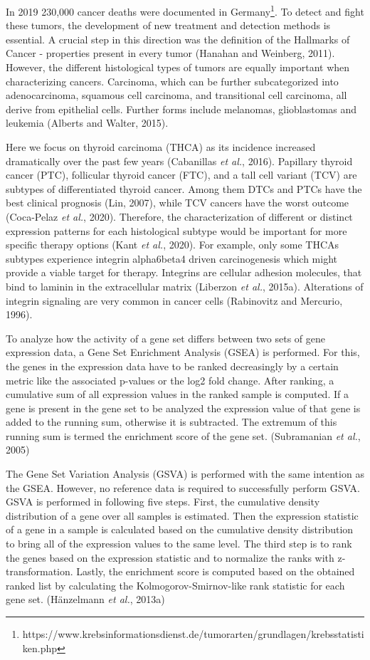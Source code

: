 \documentclass[
  11pt,
  parskip,
  oneside]{scrreprt}
\begin{document}
In 2019 230,000 cancer deaths were documented in
Germany\footnote{ https://www.krebsinformationsdienst.de/tumorarten/grundlagen/krebsstatistiken.php}.
To detect and fight these tumors, the development of new treatment and
detection methods is essential. A crucial step in this direction was the
definition of the Hallmarks of Cancer - properties present in every
tumor (Hanahan and Weinberg, 2011). However, the different histological
types of tumors are equally important when characterizing cancers.
Carcinoma, which can be further subcategorized into adenocarcinoma,
squamous cell carcinoma, and transitional cell carcinoma, all derive
from epithelial cells. Further forms include melanomas, glioblastomas
and leukemia (Alberts and Walter, 2015).

Here we focus on thyroid carcinoma (THCA) as its incidence increased
dramatically over the past few years (Cabanillas \emph{et al.}, 2016).
Papillary thyroid cancer (PTC), follicular thyroid cancer (FTC), and a
tall cell variant (TCV) are subtypes of differentiated thyroid cancer.
Among them DTCs and PTCs have the best clinical prognosis (Lin, 2007),
while TCV cancers have the worst outcome (Coca-Pelaz \emph{et al.},
2020). Therefore, the characterization of different or distinct
expression patterns for each histological subtype would be important for
more specific therapy options (Kant \emph{et al.}, 2020). For example,
only some THCAs subtypes experience integrin alpha6beta4 driven
carcinogenesis which might provide a viable target for therapy.
Integrins are cellular adhesion molecules, that bind to laminin in the
extracellular matrix (Liberzon \emph{et al.}, 2015a). Alterations of
integrin signaling are very common in cancer cells (Rabinovitz and
Mercurio, 1996).

To analyze how the activity of a gene set differs between two sets of
gene expression data, a Gene Set Enrichment Analysis (GSEA) is
performed. For this, the genes in the expression data have to be ranked
decreasingly by a certain metric like the associated p-values or the
log2 fold change. After ranking, a cumulative sum of all expression
values in the ranked sample is computed. If a gene is present in the
gene set to be analyzed the expression value of that gene is added to
the running sum, otherwise it is subtracted. The extremum of this
running sum is termed the enrichment score of the gene set. (Subramanian
\emph{et al.}, 2005)

The Gene Set Variation Analysis (GSVA) is performed with the same
intention as the GSEA. However, no reference data is required to
successfully perform GSVA. GSVA is performed in following five steps.
First, the cumulative density distribution of a gene over all samples is
estimated. Then the expression statistic of a gene in a sample is
calculated based on the cumulative density distribution to bring all of
the expression values to the same level. The third step is to rank the
genes based on the expression statistic and to normalize the ranks with
z-transformation. Lastly, the enrichment score is computed based on the
obtained ranked list by calculating the Kolmogorov-Smirnov-like rank
statistic for each gene set. (Hänzelmann \emph{et al.}, 2013a)
\end{document}
